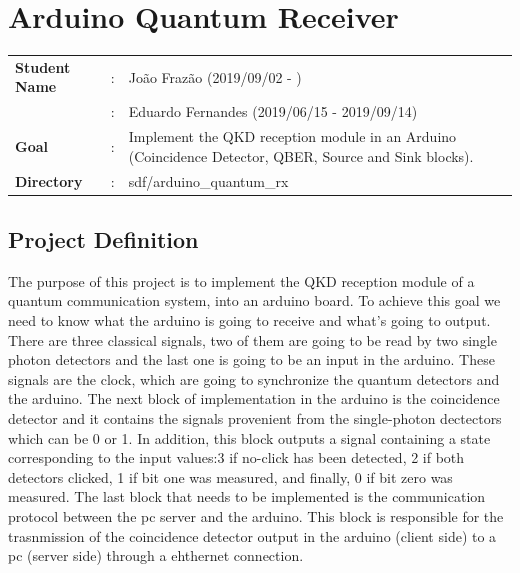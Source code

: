 \clearpage
\section{Arduino Quantum Receiver}

\begin{refsection}
	
	\begin{tcolorbox}	
		\begin{tabular}{p{2.75cm} p{0.2cm} p{10.5cm}} 	
			\textbf{Student Name}  		&:&  Jo\~ao Fraz\~ao (2019/09/02 - )\\
			&:&  Eduardo Fernandes (2019/06/15 - 2019/09/14)\\
			\textbf{Goal}          &:& Implement the QKD reception module in an Arduino (Coincidence Detector, QBER, Source and Sink blocks).\\
			\textbf{Directory}              &:& sdf/arduino\_quantum\_rx
		\end{tabular}
	\end{tcolorbox}
	
	
	\subsection{Project Definition}
	
		The purpose of this project is to implement the QKD reception module of a quantum communication system, into an arduino board. To achieve this goal we need to know what the arduino is going to receive and what's going to output.
		There are three classical signals, two of them are going to be read by two single photon detectors and the last one is going to be an input in the arduino. These signals are the clock, which are going to synchronize the quantum detectors and the arduino. The next block of implementation in the arduino is the coincidence detector and it contains the signals provenient from the single-photon dectectors which can be 0 or 1. In addition, this block outputs a signal containing a state corresponding to the input values:3 if no-click has been detected, 2 if both detectors clicked, 1 if bit one was measured, and finally, 0 if bit zero was measured. The last block that needs to be implemented is the communication protocol between the pc server and the arduino. This block is responsible for the trasnmission of the coincidence detector output in the arduino (client side) to a pc (server side) through a ehthernet connection. 
	

\end{refsection}
